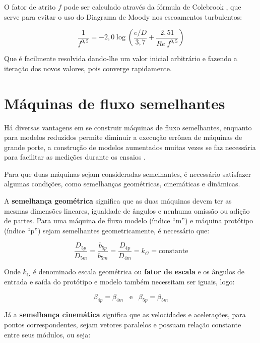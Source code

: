     O fator de atrito $f$ pode ser calculado através da fórmula de Colebrook \cite{fox}, que serve para evitar o uso do Diagrama de Moody nos escoamentos turbulentos:

    \begin{equation} \label{eq-colebrook}
    \frac{1}{f^{0,5}} = -2,0 \log \left( \frac{e/D}{3,7} + \frac{2,51}{Re\;f^{0,5}} \right)
    \end{equation}

    Que é facilmente resolvida dando-lhe um valor inicial arbitrário  e fazendo a iteração dos novos valores, pois converge rapidamente.

\section{Máquinas de fluxo semelhantes}

    Há diversas vantagens em se construir máquinas de fluxo semelhantes, enquanto para modelos reduzidos permite diminuir a execução errônea de máquinas de grande porte, a construção de modelos aumentados muitas vezes se faz necessária para facilitar as medições durante os ensaios \cite{maq_fluidos_henn}.

    Para que duas máquinas sejam consideradas semelhantes, é necessário satisfazer algumas condições, como semelhanças geométricas, cinemáticas e dinâmicas.

    A \textbf{semelhança geométrica} significa que as duas máquinas devem ter as mesmas dimensões lineares, igualdade de ângulos e nenhuma omissão ou adição de partes. Para uma máquina de fluxo modelo (índice ``m'') e máquina protótipo (índice ``p'') sejam semelhantes geometricamente, é necessário que:

    \begin{equation} \label{eq-geometrica}
        \frac{D_{5p}}{D_{5m}} = \frac{b_{5p}}{b_{5m}} = \frac{D_{4p}}{D_{4m}} = k_G = \mbox{constante}
    \end{equation}

    Onde $k_G$ é denominado escala geométrica ou \textbf{fator de escala} e os ângulos de entrada e saída do protótipo e modelo também necessitam ser iguais, logo:

    \begin{equation}
        \beta_{4p} = \beta_{4m} \; \; \; \mbox{e} \; \; \; \beta_{5p} = \beta_{5m}
    \end{equation}

    Já a \textbf{semelhança cinemática} significa que as velocidades e acelerações, para pontos correspondentes, sejam vetores paralelos e possuam relação constante entre seus módulos, ou seja:

